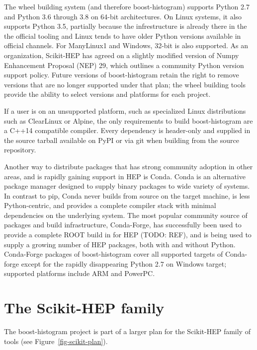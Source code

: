 \documentclass{webofc}
\begin{document}
The wheel building system (and therefore boost-histogram) supports Python 2.7 and Python 3.6 through 3.8 on 64-bit architectures. On Linux systems, it also supports Python 3.5, partially because the infrestructure is already there in the the official tooling and Linux tends to have older Python versions available in official channels. For ManyLinux1 and Windows, 32-bit is also supported. As an organization, Scikit-HEP has agreed on a slightly modified version of Numpy Enhancement Proposal (NEP) 29, which outlines a community Python version support policy. Future versions of boost-histogram retain the right to remove versions that are no longer supported under that plan; the wheel building tools provide the ability to select versions and platforms for each project.

If a user is on an unsupported platform, such as specialized Linux distributions such as ClearLinux or Alpine, the only requirements to build boost-histogram are a C++14 compatible compiler. Every dependency is header-only and supplied in the source tarball available on PyPI or via git when building from the source repository.

Another way to distribute packages that has strong community adoption in other areas, and is rapidly gaining support in HEP is Conda. Conda is an alternative package manager designed to supply binary packages to wide variety of systems. In contrast to pip, Conda never builds from source on the target machine, is less Python-centric, and provides a complete compiler stack with minimal dependencies on the underlying system. The most popular community source of packages and build infrastructure, Conda-Forge, has successfully been used to provide a complete ROOT build in for HEP (TODO: REF), and is being used to supply a growing number of HEP packages, both with and without Python. Conda-Forge packages of boost-histogram cover all supported targets of Conda-forge except for the rapidly disappearing Python 2.7 on Windows target; supported platforms include ARM and PowerPC.

\section{The Scikit-HEP family}
\label{sec-3}

The boost-histogram project is part of a larger plan for the Scikit-HEP family of tools (see Figure~\ref{fig-scikit-plan}).
\end{document}
